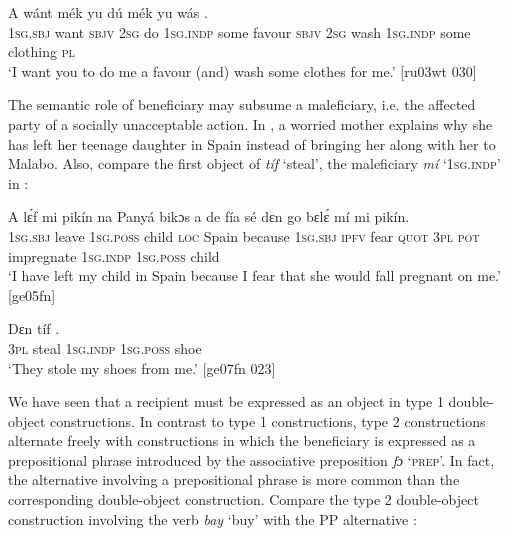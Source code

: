 \ea%
    \label{ex:key:1210}
    \gll A    wánt  mék    yu  dú             mék
yu  wás               .\\
\textsc{1sg.sbj}  want  \textsc{sbjv}    \textsc{2sg}  do  \textsc{1sg.indp}  some  favour  \textsc{sbjv}
\textsc{2sg}  wash  \textsc{1sg.indp}  some  clothing  \textsc{pl}\\

\glt ‘I want you to do me a favour (and) wash some clothes for me.’ [ru03wt 030]
\z

The semantic role of beneficiary may subsume a maleficiary, i.e. the affected party of a socially unacceptable action. In , a worried mother explains why she has left her teenage daughter in Spain instead of bringing her along with her to Malabo. Also, compare the first object of \textit{tíf} ‘steal’, the maleficiary \textit{mí} ‘\textsc{1sg.indp}’ in :


\ea%
    \label{ex:key:1211}
    \gll A    lɛ́f    mi    pikín  na  Panyá  bikɔs  a    de  fía
sé    dɛn  go  bɛlɛ́      mí    mi  pikín.\\
\textsc{1sg.sbj}  leave  \textsc{1sg.poss}  child  \textsc{loc}  Spain  because  \textsc{1sg.sbj}  \textsc{ipfv}  fear
\textsc{quot}    \textsc{3pl}  \textsc{pot}  impregnate  \textsc{1sg.indp}  \textsc{1sg.poss}  child\\

\glt ‘I have left my child in Spain because I fear that she would fall pregnant on me.’ [ge05fn]
\z


\ea%
    \label{ex:key:1212}
    \gll Dɛn    tíf            .\\
\textsc{3pl}    steal  \textsc{1sg.indp}  \textsc{1sg.poss}  shoe\\

\glt ‘They stole my shoes from me.’ [ge07fn 023]
\z

We have seen that a recipient must be expressed as an object in type 1 double-object constructions. In contrast to type 1 constructions, type 2 constructions alternate freely with constructions in which the beneficiary is expressed as a prepositional phrase introduced by the associative preposition \textit{fɔ} ‘\textsc{prep}’. In fact, the alternative involving a prepositional phrase is more common than the corresponding double-object construction. Compare the type 2 double-object construction  involving the verb \textit{bay} ‘buy’ with the PP alternative :


